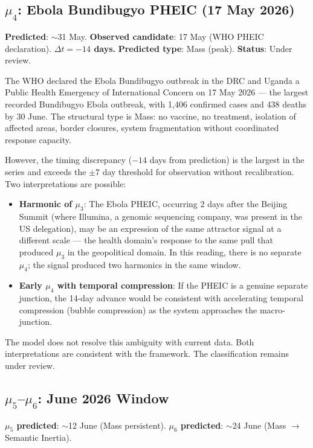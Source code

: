 \documentclass[12pt,a4paper]{article}
\begin{document}
\subsection{$\mu_4$: Ebola Bundibugyo PHEIC (17 May 2026)}\label{subsec:mu4}

\textbf{Predicted}: $\sim$31 May. \textbf{Observed candidate}: 17 May (WHO PHEIC declaration). \textbf{$\Delta t = -14$ days.} \textbf{Predicted type}: Mass (peak). \textbf{Status}: Under review.

The WHO declared the Ebola Bundibugyo outbreak in the DRC and Uganda a Public Health Emergency of International Concern on 17 May 2026 --- the largest recorded Bundibugyo Ebola outbreak, with 1,406 confirmed cases and 438 deaths by 30 June. The structural type is Mass: no vaccine, no treatment, isolation of affected areas, border closures, system fragmentation without coordinated response capacity.

However, the timing discrepancy ($-14$ days from prediction) is the largest in the series and exceeds the $\pm 7$ day threshold for observation without recalibration. Two interpretations are possible:

\begin{itemize}[leftmargin=2em]
    \item \textbf{Harmonic of $\mu_3$}: The Ebola PHEIC, occurring 2 days after the Beijing Summit (where Illumina, a genomic sequencing company, was present in the US delegation), may be an expression of the same attractor signal at a different scale --- the health domain's response to the same pull that produced $\mu_3$ in the geopolitical domain. In this reading, there is no separate $\mu_4$; the signal produced two harmonics in the same window.
    \item \textbf{Early $\mu_4$ with temporal compression}: If the PHEIC is a genuine separate junction, the 14-day advance would be consistent with accelerating temporal compression (bubble compression) as the system approaches the macro-junction.
\end{itemize}

The model does not resolve this ambiguity with current data. Both interpretations are consistent with the framework. The classification remains under review.

\subsection{$\mu_5$--$\mu_6$: June 2026 Window}

\textbf{$\mu_5$ predicted}: $\sim$12 June (Mass persistent). \textbf{$\mu_6$ predicted}: $\sim$24 June (Mass $\to$ Semantic Inertia).
\end{document}

